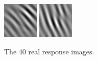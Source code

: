 \begin{figure}[ht]
\begin{center}
  \includegraphics[width=\columnwidth/9]{ch4/figures/real_3_6.jpg}
  \includegraphics[width=\columnwidth/9]{ch4/figures/real_3_7.jpg}\\
\caption{The 40 real response images.}
\label{fig:realresponses}
 \end{center}
\end{figure} 
